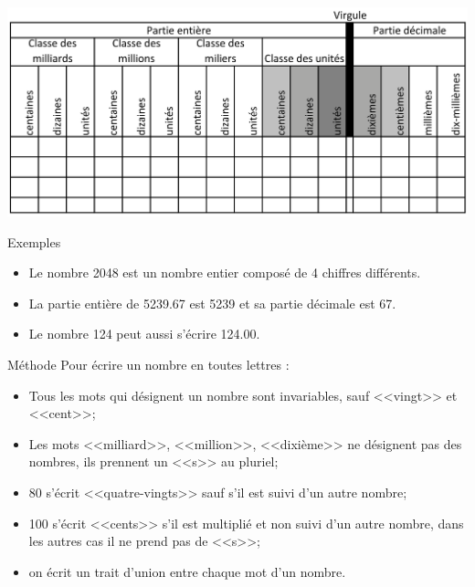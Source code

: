 \documentclass[xcolor={dvipsnames}]{beamer}
\begin{document}
\begin{frame}
	
	\begin{center}
		\includegraphics[scale=.25]{tab_rangs}\pause
	\end{center}

	\begin{exampleblock}{Exemples}
		\begin{itemize}
			\item Le nombre \num{2048} est un nombre entier composé de 4 chiffres différents.
			\item La partie entière de \num{5239.67}  est \num{5239} et sa partie décimale est 67.	
			
			\item Le nombre \num{124} peut aussi s'écrire \num{124.00}.
		\end{itemize}
	\end{exampleblock}
\end{frame}


\begin{frame}
	
	
	
	\begin{block}{Méthode}
		Pour \'ecrire un nombre en toutes lettres :\pause
		\begin{itemize}
			\item Tous les mots qui désignent un nombre sont invariables, sauf <<vingt>> et <<cent>>;\pause
			\item Les mots <<milliard>>, <<million>>, <<dixième>> ne désignent pas des nombres, ils prennent un <<s>> au pluriel;\pause
			\item 80 s'écrit <<quatre-vingts>> sauf s'il est suivi d'un autre nombre;\pause
			\item 100 s'écrit <<cents>> s'il est multiplié et non suivi d'un autre nombre, dans les autres cas il ne prend pas de <<s>>;\pause
			\item on écrit un trait d'union entre chaque mot d'un nombre.
		\end{itemize}
	\end{block}
\end{frame}
\end{document}
